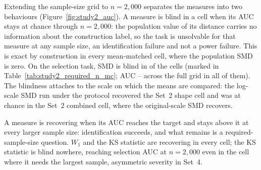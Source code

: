 \documentclass[AMA,Times1COL]{WileyNJDv5}
\begin{document}
Extending the sample-size grid to $n = 2{,}000$ separates the measures into two behaviours (Figure~\ref{fig:study2_auc}). A measure is blind in a cell when its AUC stays at chance through $n = 2{,}000$: the population value of its distance carries no information about the construction label, so the task is unsolvable for that measure at any sample size, an identification failure and not a power failure. This is exact by construction in every mean-matched cell, where the population SMD is zero. On the selection task, SMD is blind in  of the  cells (marked in Table~\ref{tab:study2_required_n_mc}; AUC -- across the full grid in all of them). The blindness attaches to the scale on which the means are compared: the log-scale SMD run under the protocol recovered the Set~2 shape cell and was at chance in the Set~2 combined cell, where the original-scale SMD recovers.

A measure is recovering when its AUC reaches the target and stays above it at every larger sample size: identification succeeds, and what remains is a required-sample-size question. $W_1$ and the KS statistic are recovering in every cell; the KS statistic is blind nowhere, reaching selection AUC  at $n = 2{,}000$ even in the cell where it needs the largest sample, asymmetric severity in Set~4.
\end{document}

